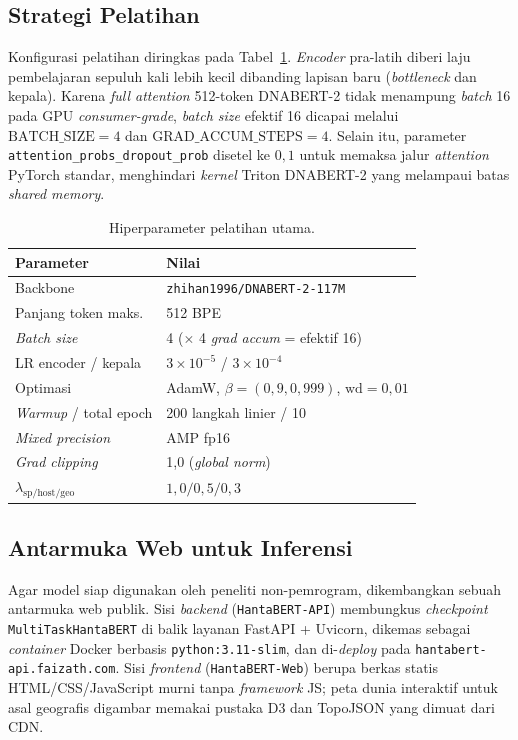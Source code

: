 \documentclass[conference]{IEEEtran}
\begin{document}
\subsection{Strategi Pelatihan}

Konfigurasi pelatihan diringkas pada Tabel~\ref{tab:hyper}. \emph{Encoder}
pra-latih diberi laju pembelajaran sepuluh kali lebih kecil dibanding
lapisan baru (\emph{bottleneck} dan kepala). Karena \emph{full attention}
512-token DNABERT-2 tidak menampung \emph{batch} 16 pada GPU
\emph{consumer-grade}, \emph{batch size} efektif 16 dicapai melalui
$\text{BATCH\_SIZE}{=}4$ dan $\text{GRAD\_ACCUM\_STEPS}{=}4$. Selain itu,
parameter \texttt{attention\_probs\_dropout\_prob} disetel ke $0{,}1$
untuk memaksa jalur \emph{attention} PyTorch standar, menghindari
\emph{kernel} Triton DNABERT-2 yang melampaui batas \emph{shared memory}.

\begin{table}[t]
\centering
\caption{Hiperparameter pelatihan utama.}
\label{tab:hyper}
\begin{tabular}{ll}
\toprule
\textbf{Parameter} & \textbf{Nilai} \\
\midrule
Backbone & \texttt{zhihan1996/DNABERT-2-117M} \\
Panjang token maks. & 512 BPE \\
\emph{Batch size} & 4 ($\times$ 4 \emph{grad accum} = efektif 16) \\
LR encoder / kepala & $3{\times}10^{-5}$ / $3{\times}10^{-4}$ \\
Optimasi & AdamW, $\beta=(0{,}9,0{,}999)$, $\text{wd}=0{,}01$ \\
\emph{Warmup} / total epoch & 200 langkah linier / 10 \\
\emph{Mixed precision} & AMP fp16 \\
\emph{Grad clipping} & 1{,}0 (\emph{global norm}) \\
$\lambda_{\text{sp/host/geo}}$ & $1{,}0/0{,}5/0{,}3$ \\
\bottomrule
\end{tabular}
\end{table}

\subsection{Antarmuka Web untuk Inferensi}\label{sec:webui}

Agar model siap digunakan oleh peneliti non-pemrogram, dikembangkan
sebuah antarmuka web publik. Sisi \emph{backend} (\texttt{HantaBERT-API})
membungkus \emph{checkpoint} \texttt{MultiTaskHantaBERT} di balik
layanan FastAPI + Uvicorn, dikemas sebagai \emph{container} Docker
berbasis \texttt{python:3.11-slim}, dan di-\emph{deploy} pada
\texttt{hantabert-api.faizath.com}. Sisi \emph{frontend}
(\texttt{HantaBERT-Web}) berupa berkas statis HTML/CSS/JavaScript murni
tanpa \emph{framework} JS; peta dunia interaktif untuk asal geografis
digambar memakai pustaka D3 dan TopoJSON yang dimuat dari CDN.
\end{document}
